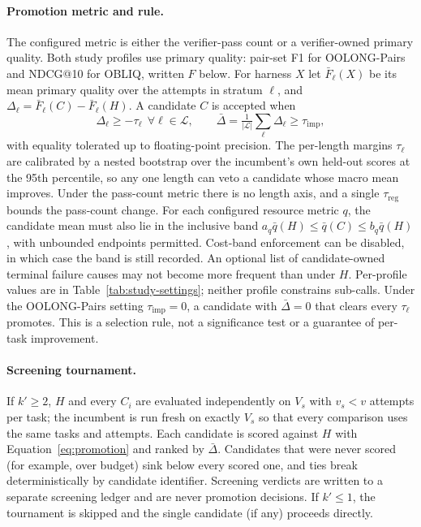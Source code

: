 \paragraph{Promotion metric and rule.}
The configured metric is either the verifier-pass count or a verifier-owned
primary quality. Both study profiles use primary quality: pair-set F1 for
OOLONG-Pairs and NDCG@10 for OBLIQ, written $F$ below. For harness $X$ let
$\bar F_\ell(X)$ be its mean primary quality over the attempts in stratum $\ell$, and
$\Delta_\ell=\bar F_\ell(C)-\bar F_\ell(H)$. A candidate $C$ is accepted when
\begin{equation}
\Delta_\ell\geq-\tau_\ell\ \ \forall\ell\in\mathcal{L},\qquad
\bar\Delta=\tfrac{1}{|\mathcal{L}|}\textstyle\sum_{\ell}\Delta_\ell\geq\tau_{\mathrm{imp}},
\label{eq:promotion}
\end{equation}
with equality tolerated up to floating-point precision. The per-length margins
$\tau_\ell$ are calibrated by a nested bootstrap over the incumbent's own
held-out scores at the 95th percentile, so any one length can veto a candidate
whose macro mean improves. Under the pass-count metric there is no length axis,
and a single $\tau_{\mathrm{reg}}$ bounds the pass-count change. For each
configured resource metric $q$, the candidate mean must also lie in the
inclusive band $a_q\bar q(H)\leq\bar q(C)\leq b_q\bar q(H)$, with unbounded
endpoints permitted. Cost-band enforcement can be disabled, in which case the
band is still recorded. An optional list of candidate-owned terminal failure
causes may not become more frequent than under $H$. Per-profile values are in
Table~\ref{tab:study-settings}; neither profile constrains sub-calls. Under the
OOLONG-Pairs setting $\tau_{\mathrm{imp}}=0$, a candidate with $\bar\Delta=0$
that clears every $\tau_\ell$ promotes. This is a selection rule, not a significance
test or a guarantee of per-task improvement.

\paragraph{Screening tournament.}
If $k'\ge2$, $H$ and every $C_i$ are evaluated independently on $V_s$ with
$v_s<v$ attempts per task; the incumbent is run fresh on exactly $V_s$ so that
every comparison uses the same tasks and attempts. Each candidate is scored
against $H$ with Equation~\ref{eq:promotion} and ranked by $\bar\Delta$.
Candidates that were never scored (for example, over budget) sink below every
scored one, and ties break deterministically by candidate identifier. Screening
verdicts are written to a separate screening ledger and are never promotion
decisions. If $k'\le1$, the tournament is skipped and the single candidate (if
any) proceeds directly.

